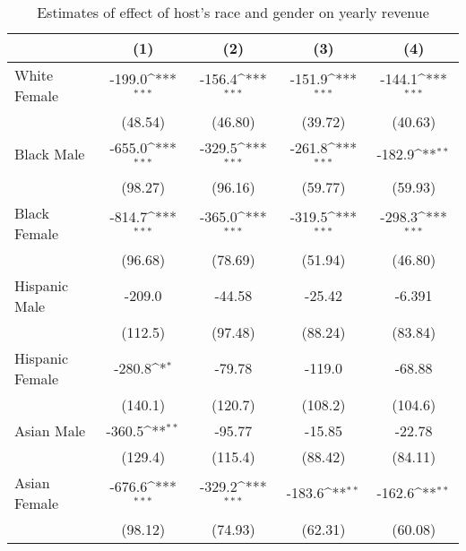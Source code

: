 {
\def\sym#1{\ifmmode^{#1}\else\(^{#1}\)\fi}
\begin{longtable}{l*{4}{c}}
\caption{Estimates of effect of host's race and gender on yearly revenue}\\
\hline\hline\endfirsthead\hline\endhead\hline\endfoot\endlastfoot
                    &\multicolumn{1}{c}{(1)}&\multicolumn{1}{c}{(2)}&\multicolumn{1}{c}{(3)}&\multicolumn{1}{c}{(4)}\\
\hline
White Female        &      -199.0\sym{***}&      -156.4\sym{***}&      -151.9\sym{***}&      -144.1\sym{***}\\
                    &     (48.54)         &     (46.80)         &     (39.72)         &     (40.63)         \\
[1em]
Black Male          &      -655.0\sym{***}&      -329.5\sym{***}&      -261.8\sym{***}&      -182.9\sym{**} \\
                    &     (98.27)         &     (96.16)         &     (59.77)         &     (59.93)         \\
[1em]
Black Female        &      -814.7\sym{***}&      -365.0\sym{***}&      -319.5\sym{***}&      -298.3\sym{***}\\
                    &     (96.68)         &     (78.69)         &     (51.94)         &     (46.80)         \\
[1em]
Hispanic Male       &      -209.0         &      -44.58         &      -25.42         &      -6.391         \\
                    &     (112.5)         &     (97.48)         &     (88.24)         &     (83.84)         \\
[1em]
Hispanic Female     &      -280.8\sym{*}  &      -79.78         &      -119.0         &      -68.88         \\
                    &     (140.1)         &     (120.7)         &     (108.2)         &     (104.6)         \\
[1em]
Asian Male          &      -360.5\sym{**} &      -95.77         &      -15.85         &      -22.78         \\
                    &     (129.4)         &     (115.4)         &     (88.42)         &     (84.11)         \\
[1em]
Asian Female        &      -676.6\sym{***}&      -329.2\sym{***}&      -183.6\sym{**} &      -162.6\sym{**} \\
                    &     (98.12)         &     (74.93)         &     (62.31)         &     (60.08)         \\

\end{longtable}}
